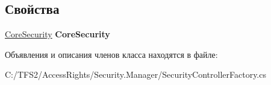\subsection*{Свойства}
\begin{DoxyCompactItemize}
\item 
\mbox{\label{class_security_1_1_manager_1_1_base_security_controller_adc09b6f2192fe120b312362d69b0ee9f}} 
\hyperlink{class_security_1_1_core_security}{Core\+Security} {\bfseries Core\+Security}
\end{DoxyCompactItemize}


Объявления и описания членов класса находятся в файле\+:\begin{DoxyCompactItemize}
\item 
C\+:/\+T\+F\+S2/\+Access\+Rights/\+Security.\+Manager/Security\+Controller\+Factory.\+cs\end{DoxyCompactItemize}
